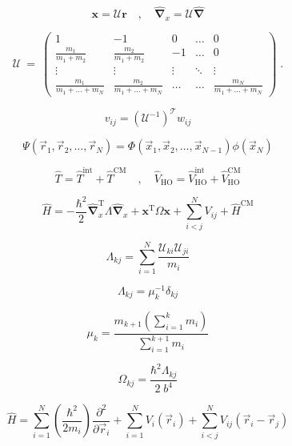 \begin{equation}
	\boldsymbol{x} = \mathcal{U} \boldsymbol{r} \quad , \quad \hat{\boldsymbol{\nabla}}_x = \mathcal{U} \hat{\boldsymbol{\nabla}}
\end{equation}
	
\begin{equation}
 \mathcal{U} \: = \: \begin{pmatrix}
1 & -1 & 0 & \hdots & 0 \\
\frac{m_1}{m_1 + m_2} & \frac{m_2}{m_1 + m_2} & -1 & \hdots & 0 \\
\vdots & \vdots & \vdots & \ddots & \vdots \\
\frac{m_1}{m_1 + \ldots + m_N} & \frac{m_2}{m_1  + \ldots + m_N} & \hdots & \hdots & \frac{m_N}{m_1  + \ldots + m_N}
\end{pmatrix} \; .
\end{equation}

\begin{equation}
	 v_{i j} = \left( \mathcal{U}^{-1} \right) ^{\mathcal{T}} w_{i j} 
\end{equation}

\begin{equation}
	\Psi \left( \vec{r}_1 , \vec{r}_2 , \ldots , \vec{r}_N \right) = \Phi \left( \vec{x}_1 , \vec{x}_2 , \ldots , \vec{x}_{N-1} \right) \phi( \vec{x}_N )
\end{equation}

\begin{equation}
	\hat{T} = \hat{T}^{\mathrm{int}} + \hat{T}^{\mathrm{CM}} \quad , \quad \hat{V}_{\mathrm{HO}} = \hat{V}_{\mathrm{HO}}^{\mathrm{int}} + \hat{V}_{\mathrm{HO}}^{\mathrm{CM}} 
\end{equation}

\begin{equation}
	\hat{H} = - \frac{\hbar^2}{2} \hat{\boldsymbol{\nabla}}_{x}^{\mathrm{T}} \Lambda \hat{\boldsymbol{\nabla}}_x + \boldsymbol{x}^{\mathrm{T}} \Omega \boldsymbol{x} + \sum_{i < j}^{N} V_{ij} + \hat{H}^{\mathrm{CM}} 
\end{equation}

\begin{equation}
	\Lambda_{kj} = \sum_{i = 1}^{N} \frac{\mathcal{U}_{ki} \mathcal{U}_{ji}}{m_i}
\end{equation}

\begin{equation}
	\Lambda_{kj} = \mu_{k}^{-1} \delta_{kj}
\end{equation}

\begin{equation}
	\mu_k = \frac{m_{k+1} \left( \sum_{i= 1}^{k} m_{i} \right)}{\sum_{i= 1}^{k+1} m_{i}}
\end{equation}

\begin{equation}
	\Omega_{kj} = \frac{\hbar^2 \Lambda_{kj} }{2 \;  b^4 }
\end{equation}




\begin{equation}
\hat{H} = \sum_{i = 1}^{N} \left( \frac{\hbar ^2}{2 m_i} \right) \frac{\partial ^2}{\partial \vec{r}_i} + \sum_{i = 1}^{N} V_i (\vec{r}_i) + \sum_{i < j}^{N} V_{ij} (\vec{r}_i - \vec{r}_j) 
\end{equation}